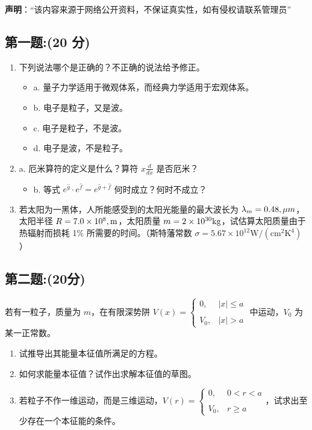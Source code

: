 
\textbf{声明}：“该内容来源于网络公开资料，不保证真实性，如有侵权请联系管理员”

\subsection{第一题:(20 分)}
\begin{enumerate}
  \item 下列说法哪个是正确的？不正确的说法给予修正。
  \begin{itemize}
    \item a. 量子力学适用于微观体系，而经典力学适用于宏观体系。
    \item b. 电子是粒子，又是波。
    \item c. 电子是粒子，不是波。
    \item d. 电子是波，不是粒子。
  \end{itemize}
  
  \item a. 厄米算符的定义是什么？算符 $x \frac{d}{dx}$ 是否厄米？
  \begin{itemize}
    \item b. 等式 $e^{\hat g} \cdot e^{\hat f} = e^{\hat g+\hat f}$ 何时成立？何时不成立？
  \end{itemize}
  
  \item 若太阳为一黑体，人所能感受到的太阳光能量的最大波长为 $\lambda_m = 0.48 \\, \mu m$，太阳半径 $R = 7.0 \times 10^8 \\, \text{m}$，太阳质量 $m = 2 \times 10^{30} \\ \text{kg}$，试估算太阳质量由于热辐射而损耗 1\% 所需要的时间。（斯特藩常数 $\sigma = 5.67 \times 10^{12}  \text{W} / (\text{cm}^2  \text{K}^4)$）
\end{enumerate}
\subsection{第二题:(20分)}
若有一粒子，质量为 $m$，在有限深势阱 $V(x) = \begin{cases}
0, & |x| \leq a \\\\
V_0, & |x| > a
\end{cases}$ 中运动，$V_0$ 为某一正常数。

\begin{enumerate}
  \item 试推导出其能量本征值所满足的方程。
  \item 如何求能量本征值？试作出求解本征值的草图。
  \item 若粒子不作一维运动，而是三维运动，$V(r) = \begin{cases}
0, & 0 < r < a \\\\
V_0, & r \geq a
\end{cases}$，试求出至少存在一个本征能的条件。
\end{enumerate}
